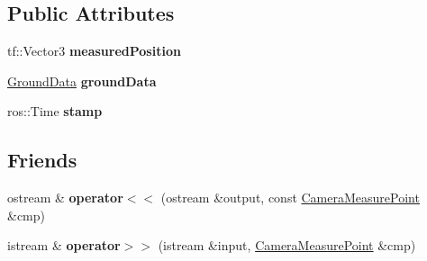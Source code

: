 \subsection*{\-Public \-Attributes}
\begin{DoxyCompactItemize}
\item 
\hypertarget{classCameraMeasurePoint_a5c2735947cad152b61ee5a5533f10e93}{tf\-::\-Vector3 {\bfseries measured\-Position}}\label{classCameraMeasurePoint_a5c2735947cad152b61ee5a5533f10e93}

\item 
\hypertarget{classCameraMeasurePoint_a33ba739473857149068b5a4529278539}{\hyperlink{classGroundData}{\-Ground\-Data} {\bfseries ground\-Data}}\label{classCameraMeasurePoint_a33ba739473857149068b5a4529278539}

\item 
\hypertarget{classCameraMeasurePoint_a6f1026a96880cbafc51eaf3461342ae4}{ros\-::\-Time {\bfseries stamp}}\label{classCameraMeasurePoint_a6f1026a96880cbafc51eaf3461342ae4}

\end{DoxyCompactItemize}
\subsection*{\-Friends}
\begin{DoxyCompactItemize}
\item 
\hypertarget{classCameraMeasurePoint_aca7ee4caa1a60efd63c2108f8b0e813c}{ostream \& {\bfseries operator$<$$<$} (ostream \&output, const \hyperlink{classCameraMeasurePoint}{\-Camera\-Measure\-Point} \&cmp)}\label{classCameraMeasurePoint_aca7ee4caa1a60efd63c2108f8b0e813c}

\item 
\hypertarget{classCameraMeasurePoint_ab4e8c4560da3882efc55092c741e1d2f}{istream \& {\bfseries operator$>$$>$} (istream \&input, \hyperlink{classCameraMeasurePoint}{\-Camera\-Measure\-Point} \&cmp)}\label{classCameraMeasurePoint_ab4e8c4560da3882efc55092c741e1d2f}

\end{DoxyCompactItemize}


